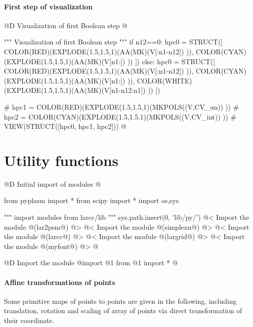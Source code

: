 \documentclass[11pt,oneside]{article}	%
\begin{document}
\paragraph{First step of visualization}

@D Visualization of first Boolean step
@{""" Visualization of first Boolean step  """
if n12==0:
	hpc0 = STRUCT([ COLOR(RED)(EXPLODE(1.5,1.5,1)(AA(MK)(V[:n1-n12]) )), 
				COLOR(CYAN)(EXPLODE(1.5,1.5,1)(AA(MK)(V[n1:]) )) ])
else:
	hpc0 = STRUCT([ COLOR(RED)(EXPLODE(1.5,1.5,1)(AA(MK)(V[:n1-n12]) )), 
				COLOR(CYAN)(EXPLODE(1.5,1.5,1)(AA(MK)(V[n1:]) )), 
				COLOR(WHITE)(EXPLODE(1.5,1.5,1)(AA(MK)(V[n1-n12:n1]) )) ])

# hpc1 = COLOR(RED)(EXPLODE(1.5,1.5,1)(MKPOLS((V,CV_un)) ))
# hpc2 = COLOR(CYAN)(EXPLODE(1.5,1.5,1)(MKPOLS((V,CV_int)) ))
# VIEW(STRUCT([hpc0, hpc1, hpc2]))
@}

\appendix
\section{Utility functions}

@D Initial import of modules
@{from pyplasm import *
from scipy import *
import os,sys

""" import modules from larcc/lib """
sys.path.insert(0, 'lib/py/')
@< Import the module @(lar2psm@) @>
@< Import the module @(simplexn@) @>
@< Import the module @(larcc@) @>
@< Import the module @(largrid@) @>
@< Import the module @(myfont@) @>
@}

@D Import the module
@{import @1
from @1 import *
@}

\paragraph{Affine transformations of points} Some primitive maps of points to points are given in the following, including translation, rotation and scaling of array of points via direct transformation of their coordinate.
\end{document}
